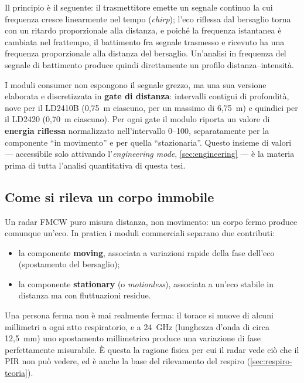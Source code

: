 Il principio è il seguente: il
trasmettitore emette un segnale continuo la cui frequenza cresce linearmente nel
tempo (\emph{chirp}); l'eco riflessa dal bersaglio torna con un ritardo
proporzionale alla distanza, e poiché la frequenza istantanea è cambiata nel
frattempo, il battimento fra segnale trasmesso e ricevuto ha una frequenza
proporzionale alla distanza del bersaglio. Un'analisi in frequenza del segnale di
battimento produce quindi direttamente un profilo distanza--intensità.

I moduli consumer non espongono il segnale grezzo, ma una sua versione elaborata e
discretizzata in \textbf{gate di distanza}: intervalli contigui di profondità, nove
per il LD2410B (0,75~m ciascuno, per un massimo di 6,75~m) e quindici per il
LD2420 (0,70~m ciascuno). Per ogni gate il modulo riporta un valore di
\textbf{energia riflessa} normalizzato nell'intervallo 0--100, separatamente per la
componente ``in movimento'' e per quella ``stazionaria''. Questo insieme di valori
--- accessibile solo attivando l'\emph{engineering mode}, \cref{sec:engineering} ---
è la materia prima di tutta l'analisi quantitativa di questa tesi.

\subsection{Come si rileva un corpo immobile}

Un radar FMCW puro misura distanza, non movimento: un corpo fermo produce comunque
un'eco. In pratica i moduli commerciali separano due contributi:

\begin{itemize}[leftmargin=1.4em,itemsep=2pt]
  \item la componente \textbf{moving}, associata a variazioni rapide della fase
        dell'eco (spostamento del bersaglio);
  \item la componente \textbf{stationary} (o \emph{motionless}), associata a
        un'eco stabile in distanza ma con fluttuazioni residue.
\end{itemize}

Una persona ferma non è mai realmente ferma: il torace si muove di alcuni
millimetri a ogni atto respiratorio, e a 24~GHz (lunghezza d'onda di circa
12,5~mm) uno spostamento millimetrico produce una variazione di fase perfettamente
misurabile. È questa la ragione fisica per cui il radar vede ciò che il PIR non può
vedere, ed è anche la base del rilevamento del respiro
(\cref{sec:respiro-teoria}).

